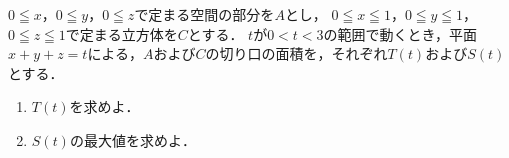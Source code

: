 \documentclass[../../main.tex]{subfiles}
\begin{document}
$0 \leqq x$，$0 \leqq y$，$0 \leqq z$で定まる空間の部分を$A$とし，
$0 \leqq x \leqq 1$，$0 \leqq y \leqq 1$，$0 \leqq z \leqq 1$で定まる立方体を$C$とする．
$t$が$0<t<3$の範囲で動くとき，平面$x+y+z=t$による，$A$および$C$の切り口の面積を，それぞれ$T(t)$および$S(t)$とする．
\begin{enumerate}
  \item $T(t)$を求めよ．
  \item $S(t)$の最大値を求めよ．
\end{enumerate}
\end{document}
